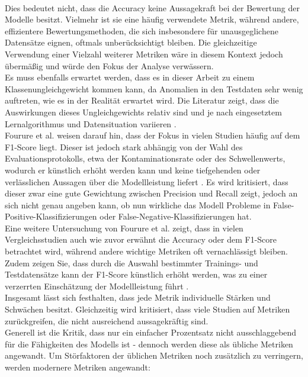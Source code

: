 \documentclass[a4paper,12pt]{article}
\begin{document}
	\\[0.5em]
	Dies bedeutet nicht, dass die Accuracy keine Aussagekraft bei der Bewertung der Modelle besitzt. Vielmehr ist sie eine häufig verwendete Metrik, während andere, effizientere Bewertungsmethoden, die sich insbesondere für unausgeglichene Datensätze eignen, oftmals unberücksichtigt bleiben. Die gleichzeitige Verwendung einer Vielzahl weiterer Metriken wäre in diesem Kontext jedoch übermäßig und würde den Fokus der Analyse verwässern.
	\\[0.5em]
	Es muss ebenfalls erwartet werden, dass es in dieser Arbeit zu einem Klassenungleichgewicht kommen kann, da Anomalien in den Testdaten sehr wenig auftreten, wie es in der Realität erwartet wird. Die Literatur zeigt, dass die Auswirkungen dieses Ungleichgewichts relativ sind und je nach eingesetztem Lernalgorithmus und Datensituation variieren \cite{japkowicz2002systematic}. 
	\\[0.5em]
	Fourure et al. weisen darauf hin, dass der Fokus in vielen Studien häufig auf dem F1-Score liegt. Dieser ist jedoch stark abhängig von der Wahl des Evaluationsprotokolls, etwa der Kontaminationsrate oder des Schwellenwerts, wodurch er künstlich erhöht werden kann und keine tiefgehenden oder verlässlichen Aussagen über die Modellleistung liefert \cite{fourure2021anomaly}. Es wird kritisiert, dass dieser zwar eine gute Gewichtung zwischen Precision und Recall zeigt, jedoch an sich nicht genau angeben kann, ob nun wirkliche das Modell Probleme in False-Positive-Klassifizierungen oder False-Negative-Klassifizierungen hat.
	\\[0.5em]
	Eine weitere Untersuchung von Fourure et al. zeigt, dass in vielen Vergleichsstudien auch wie zuvor erwähnt die Accuracy oder dem F1-Score betrachtet wird, während andere wichtige Metriken oft vernachlässigt bleiben. Zudem zeigen Sie, dass durch die Auswahl bestimmter Trainings- und Testdatensätze kann der F1-Score künstlich erhöht werden, was zu einer verzerrten Einschätzung der Modellleistung führt \cite{fourure2021anomaly}.
	\\[0.5em]
	Insgesamt lässt sich festhalten, dass jede Metrik individuelle Stärken und Schwächen besitzt. Gleichzeitig wird kritisiert, dass viele Studien auf Metriken zurückgreifen, die nicht ausreichend aussagekräftig sind.
	\\[0.5em]
	Generell ist die Kritik, dass nur ein einfacher Prozentsatz nicht ausschlaggebend für die Fähigkeiten des Modells ist - dennoch werden diese als übliche Metriken angewandt. Um Störfaktoren der üblichen Metriken noch zusätzlich zu verringern, werden modernere Metriken angewandt:
	
\end{document}
